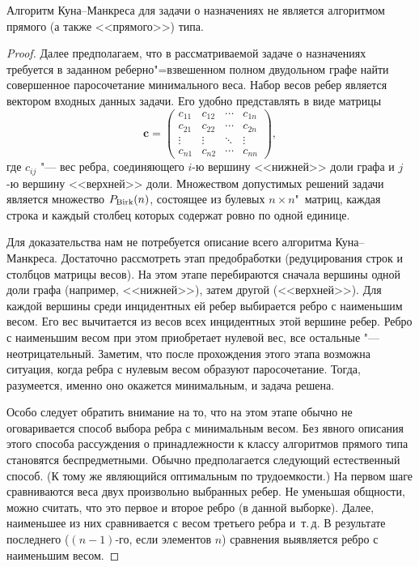 \begin{theorem}
	\label{the:assignment}
	Алгоритм Куна--Манкреса для задачи о назначениях не является
	алгоритмом прямого (а также <<прямого>>) типа.
\end{theorem}

\begin{proof}
\newcommand{\cs}{c\lefteqn{'}}
	Далее предполагаем, что в рассматриваемой задаче о назначениях требуется 
	в заданном реберно"=взвешенном полном двудольном графе найти совершенное
	паросочетание минимального веса.
	Набор весов ребер является вектором входных данных задачи.
	Его удобно представлять в виде матрицы
	\[
	\bm{c} = 
	\begin{pmatrix}
	c_{11} & c_{12} & \cdots & c_{1n} \\
	c_{21} & c_{22} & \cdots & c_{2n} \\
	\vdots & \vdots & \ddots & \vdots \\
	c_{n1} & c_{n2} & \cdots & c_{nn} 
	\end{pmatrix},
	\]
	где $c_{ij}$ "--- вес ребра, соединяющего $i$-ю вершину <<нижней>> доли графа
	и $j$-ю вершину <<верхней>> доли.
	Множеством допустимых решений задачи является множество $P_{\textup{Birk}}(n)$, состоящее из булевых $n\times n$"~матриц, каждая строка и каждый столбец которых
	содержат ровно по одной единице.
	
	Для доказательства нам не потребуется описание всего алгоритма Куна--Ман\-кре\-са.
	Достаточно рассмотреть этап предобработки (редуцирования строк и столбцов матрицы весов).
	На этом этапе перебираются сначала вершины одной доли графа (например, <<нижней>>),
	затем другой (<<верхней>>).
	Для каждой вершины среди инцидентных ей ребер выбирается ребро с наименьшим весом.
	Его вес вычитается из весов всех инцидентных этой вершине ребер.
	Ребро с наименьшим весом при этом приобретает нулевой вес,
	все остальные "--- неотрицательный.
	Заметим, что после прохождения этого этапа возможна ситуация, 
	когда ребра с нулевым весом образуют паросочетание.
	Тогда, разумеется, именно оно окажется минимальным, и задача решена.
	
	Особо следует обратить внимание на то,
	что на этом этапе обычно не оговаривается способ выбора ребра с минимальным весом.
	Без явного описания этого способа рассуждения о принадлежности 
	к классу алгоритмов прямого типа становятся беспредметными.
	Обычно предполагается следующий естественный способ.
	(К тому же являющийся оптимальным по трудоемкости.)
	На первом шаге сравниваются веса двух произвольно выбранных ребер.
	Не уменьшая общности, можно считать, что это первое и второе ребро (в данной выборке).
	Далее, наименьшее из них сравнивается с весом третьего ребра и~т.\,д.
	В результате последнего ($(n-1)$-го, если элементов $n$) сравнения выявляется ребро с наименьшим весом.
	

\end{proof}
